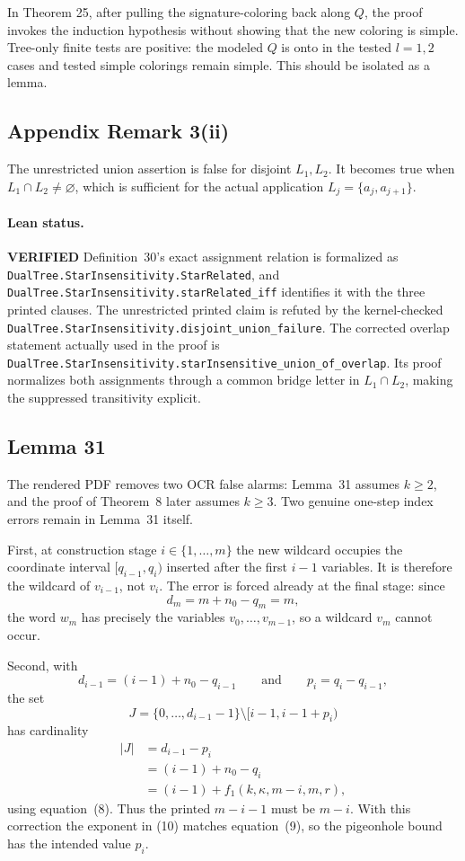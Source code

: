 \documentclass[11pt]{article}
\newcommand{\ok}{\textcolor{green!40!black}{\textbf{VERIFIED}}}
\newcommand{\lean}[1]{\texttt{#1}}
\begin{document}
In Theorem 25, after pulling the signature-coloring back along $Q$, the proof
invokes the induction hypothesis without showing that the new coloring is
simple.  Tree-only finite tests are positive: the modeled $Q$ is onto in the
tested $l=1,2$ cases and tested simple colorings remain simple.  This should be
isolated as a lemma.

\subsection{Appendix Remark 3(ii)}
The unrestricted union assertion is false for disjoint $L_1,L_2$.  It becomes
true when $L_1\cap L_2\ne\varnothing$, which is sufficient for the actual
application $L_j=\{a_j,a_{j+1}\}$.

\paragraph{Lean status.} \ok
Definition~30's exact assignment relation is formalized as
\lean{DualTree.StarInsensitivity.StarRelated}, and
\lean{DualTree.StarInsensitivity.starRelated_iff} identifies it with the
three printed clauses.  The unrestricted printed claim is refuted by the
kernel-checked
\lean{DualTree.StarInsensitivity.disjoint_union_failure}.
The corrected overlap statement actually used in the proof is
\lean{DualTree.StarInsensitivity.starInsensitive_union_of_overlap}.
Its proof normalizes both assignments through a common bridge letter in
$L_1\cap L_2$, making the suppressed transitivity explicit.

\subsection{Lemma 31}
The rendered PDF removes two OCR false alarms: Lemma~31 assumes $k\ge2$, and
the proof of Theorem~8 later assumes $k\ge3$.  Two genuine one-step index
errors remain in Lemma~31 itself.

First, at construction stage $i\in\{1,\ldots,m\}$ the new wildcard occupies
the coordinate interval $[q_{i-1},q_i)$ inserted after the first $i-1$
variables.  It is therefore the wildcard of $v_{i-1}$, not $v_i$.  The error
is forced already at the final stage: since
\[
d_m=m+n_0-q_m=m,
\]
the word $w_m$ has precisely the variables
$v_0,\ldots,v_{m-1}$, so a wildcard $v_m$ cannot occur.

Second, with
\[
d_{i-1}=(i-1)+n_0-q_{i-1}
\qquad\text{and}\qquad
p_i=q_i-q_{i-1},
\]
the set
\[
J=\{0,\ldots,d_{i-1}-1\}
   \setminus [i-1,i-1+p_i)
\]
has cardinality
\[
\begin{aligned}
|J|
 &=d_{i-1}-p_i \\
 &=(i-1)+n_0-q_i \\
 &=(i-1)+f_1(k,\kappa,m-i,m,r),
\end{aligned}
\]
using equation~(8).  Thus the printed $m-i-1$ must be $m-i$.  With this
correction the exponent in (10) matches equation~(9), so the pigeonhole bound
has the intended value $p_i$.
\end{document}
